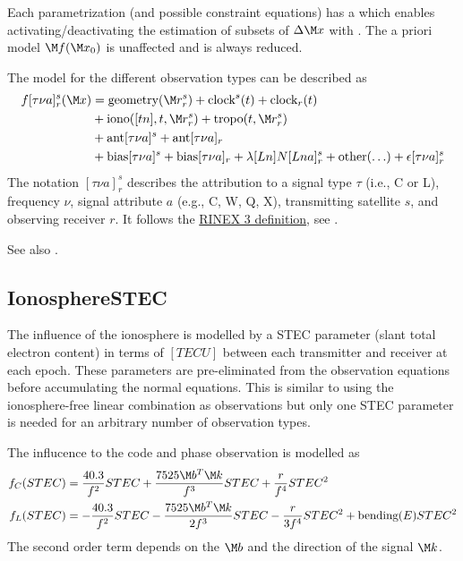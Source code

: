 Each parametrization (and possible constraint equations) has a  which enables
activating/deactivating the estimation of subsets of $\Delta\M x$ with
.
The a priori model $\M f(\M x_0)$ is unaffected and is always reduced.

The model for the different observation types can be described as
\begin{equation}\label{gnssParametrizationType:gnssFullModel}
\begin{split}
  f[\tau\nu a]_r^s(\M x) &= \text{geometry}(\M r_r^s) + \text{clock}^s(t) + \text{clock}_r(t) \\
               &+ \text{iono}([tn],t,\M r_r^s) + \text{tropo}(t,\M r_r^s) \\
               &+ \text{ant}[\tau\nu a]^s  + \text{ant}[\tau\nu a]_r \\
               &+ \text{bias}[\tau\nu a]^s + \text{bias}[\tau\nu a]_r
               + \lambda[Ln] N[Lna]_r^s + \text{other}(\ldots) + \epsilon[\tau\nu a]_r^s
\end{split}
\end{equation}
The notation $[\tau\nu a]_r^s$ describes the
attribution to a signal type $\tau$ (i.e., C or L), frequency $\nu$,
signal attribute $a$ (e.g., C, W, Q, X), transmitting satellite $s$, and observing receiver $r$.
It follows the \href{https://files.igs.org/pub/data/format/rinex305.pdf}{RINEX 3 definition},
see .

See also .


\subsection{IonosphereSTEC}\label{gnssParametrizationType:ionosphereSTEC}
The influence of the ionosphere is modelled by a STEC parameter (slant total electron content)
in terms of $[TECU]$ between each transmitter and receiver at each epoch. These parameters are pre-eliminated
from the observation equations before accumulating the normal equations.
This is similar to using the ionosphere-free linear combination as observations
but only one STEC parameter is needed for an arbitrary number of observation types.

The influcence to the code and phase observation is modelled as
\begin{equation}\label{gnssParametrizationType:IonosphereSTEC:STEC}
\begin{split}
f_C(STEC) &= \frac{40.3}{f^2}STEC + \frac{7525\M b^T\M k}{f^3}STEC +  \frac{r}{f^4}STEC^2 \\
f_L(STEC) &= -\frac{40.3}{f^2}STEC - \frac{7525\M b^T\M k}{2f^3}STEC - \frac{r}{3f^4}STEC^2 + \text{bending}(E)STEC^2
\end{split}
\end{equation}
The second order term depends on the  $\M b$
and the direction of the signal $\M k$.

